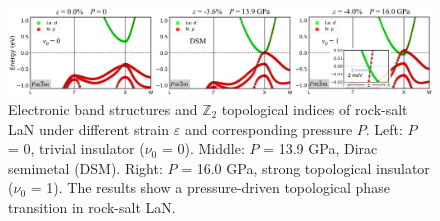 
	\begin{figure}[ht!]
	    \centering
        \captionsetup{singlelinecheck = false, justification=justified}	
		\includegraphics[width=\textwidth]{LaN_7.png}
		\caption[Topological phase transition driven by hydrostatic pressure in rock-salt LaN]{Electronic band structures and $\mathbb{Z}_2$ topological indices of rock-salt LaN under different strain $\varepsilon$ and corresponding pressure $P$. Left: $P$ = 0, trivial insulator ($\nu_0$ = 0). Middle: $P$ = 13.9 GPa, Dirac semimetal (DSM). Right: $P$ = 16.0 GPa, strong topological insulator ($\nu_0$ = 1). The results show a pressure-driven topological phase transition in rock-salt LaN.}
		\label{fig:LaN_7}
	\end{figure}	


